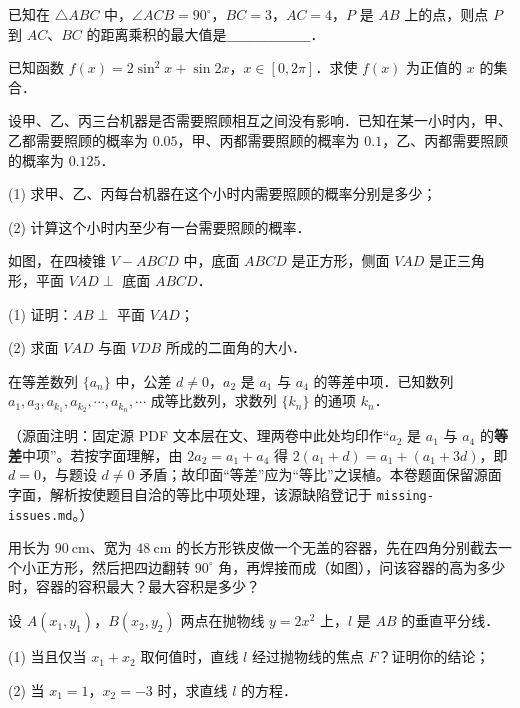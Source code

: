\begin{question}
已知在 $\triangle ABC$ 中，$\angle ACB = 90^\circ$，$BC = 3$，$AC = 4$，$P$ 是 $AB$ 上的点，则点 $P$ 到 $AC$、$BC$ 的距离乘积的最大值是＿＿＿＿＿＿．

\end{question}
\begin{question}
已知函数 $f(x) = 2\sin^2 x + \sin 2x$，$x \in [0, 2\pi]$．求使 $f(x)$ 为正值的 $x$ 的集合．

\end{question}
\begin{question}
设甲、乙、丙三台机器是否需要照顾相互之间没有影响．已知在某一小时内，甲、乙都需要照顾的概率为 $0.05$，甲、丙都需要照顾的概率为 $0.1$，乙、丙都需要照顾的概率为 $0.125$．

(1) 求甲、乙、丙每台机器在这个小时内需要照顾的概率分别是多少；

(2) 计算这个小时内至少有一台需要照顾的概率．

\Needspace{0.4\textheight}
\end{question}
\begin{question}
如图，在四棱锥 $V - ABCD$ 中，底面 $ABCD$ 是正方形，侧面 $VAD$ 是正三角形，平面 $VAD \perp$ 底面 $ABCD$．

(1) 证明：$AB \perp$ 平面 $VAD$；

(2) 求面 $VAD$ 与面 $VDB$ 所成的二面角的大小．
\nopagebreak[4]
\begin{center}\end{center}
\nopagebreak[4]
\end{question}
\begin{question}
在等差数列 $\{a_n\}$ 中，公差 $d \neq 0$，$a_2$ 是 $a_1$ 与 $a_4$ 的等差中项．已知数列 $a_1, a_3, a_{k_1}, a_{k_2}, \cdots, a_{k_n}, \cdots$ 成等比数列，求数列 $\{k_n\}$ 的通项 $k_n$．

\begin{gktip}
（源面注明：固定源 PDF 文本层在文、理两卷中此处均印作“$a_2$ 是 $a_1$ 与 $a_4$ 的\textbf{等差}中项”。若按字面理解，由 $2a_2 = a_1 + a_4$ 得 $2(a_1+d) = a_1 + (a_1+3d)$，即 $d = 0$，与题设 $d\neq 0$ 矛盾；故印面“等差”应为“等比”之误植。本卷题面保留源面字面，解析按使题目自洽的等比中项处理，该源缺陷登记于 \texttt{missing-issues.md}。）
\end{gktip}

\Needspace{0.4\textheight}
\end{question}
\begin{question}
用长为 $90\ \mathrm{cm}$、宽为 $48\ \mathrm{cm}$ 的长方形铁皮做一个无盖的容器，先在四角分别截去一个小正方形，然后把四边翻转 $90^\circ$ 角，再焊接而成（如图），问该容器的高为多少时，容器的容积最大？最大容积是多少？
\nopagebreak[4]
\begin{center}\end{center}
\nopagebreak[4]
\end{question}
\begin{question}
设 $A(x_1, y_1)$，$B(x_2, y_2)$ 两点在抛物线 $y = 2x^2$ 上，$l$ 是 $AB$ 的垂直平分线．

(1) 当且仅当 $x_1 + x_2$ 取何值时，直线 $l$ 经过抛物线的焦点 $F$？证明你的结论；

(2) 当 $x_1 = 1$，$x_2 = -3$ 时，求直线 $l$ 的方程．

\end{question}